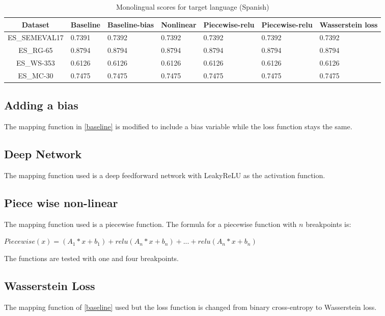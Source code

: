 \documentclass[11pt]{article}
\begin{document}
\begin{table*}[ht]
  \begin{center}
  \begin{tabular}{|c|l|l|l|l|l|l|}
  \hline
  Dataset & Baseline & Baseline-bias & Nonlinear & Piecewise-relu & Piecewise-relu & Wasserstein loss\\
  \hline
  ES\_SEMEVAL17 & 0.7391 & 0.7392 & 0.7392 & 0.7392 & 0.7392 & 0.7392 \\
  \hline
  ES\_RG-65 & 0.8794 & 0.8794 & 0.8794 & 0.8794 & 0.8794 & 0.8794 \\
  \hline
  ES\_WS-353 & 0.6126 & 0.6126 & 0.6126 & 0.6126 & 0.6126 & 0.6126 \\
  \hline
  ES\_MC-30 & 0.7475 & 0.7475 & 0.7475 & 0.7475 & 0.7475 & 0.7475 \\
  \hline
  \end{tabular}
  \end{center}
  \caption{ Monolingual scores for target language (Spanish)}
  \label{monolingual-target}
\end{table*}

\subsection{Adding a bias}
The mapping function in \ref{baseline} is modified to include a bias variable while the loss function stays the same.

\subsection{Deep Network}
The mapping function used is a deep feedforward network with LeakyReLU as the activation function.

\subsection{Piece wise non-linear}
The mapping function used is a piecewise function. The formula for a piecewise function with $n$ breakpoints is:

$Piecewise(x) = (A_1*x + b_1) + relu(A_n*x + b_n) + ... + relu(A_n*x + b_n)$

The functions are tested with one and four breakpoints.

\subsection{Wasserstein Loss}
The mapping function of \ref{baseline} used but the loss function is changed from binary cross-entropy to Wasserstein loss.
\end{document}
